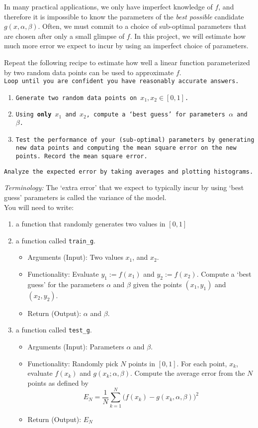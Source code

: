 \documentclass[11pt,oneside]{article}
\theoremstyle{definition}
\theoremstyle{definition}
\theoremstyle{remark}
\numberwithin{equation}{section}
\begin{document}
In many practical applications, we only have imperfect knowledge of $f$, and therefore it is impossible to know the parameters of the \textit{best possible} candidate $g(x, \alpha, \beta)$. Often, we must commit to a choice of sub-optimal parameters that are chosen after only a small glimpse of $f$. In this project, we will estimate how much more error we expect to incur by using an imperfect choice of parameters.


Repeat the following recipe to estimate how well a linear function parameterized by two random data points can be used to approximate $f$.\\
\texttt{Loop until you are confident you have reasonably accurate answers.}
\begin{enumerate}\setlength{\itemsep}{0pt}
    \item \texttt{Generate two random data points on $x_1, x_2 \in [0,1]$.}
    \item \texttt{Using \textbf{only} $x_1$ and $x_2$, compute a `best guess' for parameters $\alpha$ and $\beta$.}
    \item \texttt{Test the performance of your (sub-optimal) parameters by generating new data points and computing the mean square error on the new points. Record the mean square error.}
\end{enumerate}
\texttt{Analyze the expected error by taking averages and plotting histograms.}

\textit{Terminology:} The `extra error' that we expect to typically incur by using `best guess' parameters is called the variance of the model. \\


You will need to write:
\begin{enumerate}
    \item a function that randomly generates two values in $[0,1]$
    \item a function called \texttt{train\_g}.
    \begin{itemize}
        \item Arguments (Input): Two values $x_1$, and $x_2$.
        \item Functionality: Evaluate $y_1:=f(x_1)$ and $y_2:= f(x_2)$. Compute a `best guess' for the parameters $ \alpha$ and $ \beta$ given the points $(x_1,y_1)$ and $(x_2,y_2)$.
        \item Return (Output): $ \alpha$ and $ \beta$.
    \end{itemize}
    \item a function called \texttt{test\_g}.
    \begin{itemize}
        \item Arguments (Input): Parameters $ \alpha$ and $ \beta$.
        \item Functionality: Randomly pick $N$ points in $[0,1]$. For each point, $x_k$, evaluate $f(x_k)$ and $g(x_k;  \alpha,  \beta)$. Compute the average error from the $N$ points as defined by $$E_N = \frac{1}{N}\sum_{k = 1}^N \Big(f(x_k) - g(x_k, \alpha, \beta)\Big)^2$$
        \item Return (Output): $E_N$   
    \end{itemize}
\end{enumerate}
\end{document}
